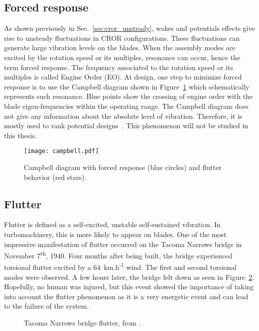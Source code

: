 
\subsection{Forced response}
\label{sub:forced_response}

As shown previously in Sec.~\ref{sec:cror_unsteady}, wakes and
potentials effects give rise to unsteady fluctuations in 
CROR configurations. These fluctuations 
can generate large vibration levels on the blades.
When the assembly modes are excited by the rotation speed
or its multiples, resonance can occur,
hence the term forced response. 
The frequency associated to the rotation speed or its multiples
is called Engine Order (EO).
At design, one step to minimize forced response is
to use the Campbell diagram shown in Figure~\ref{fig:campbell}
which schematically represents such resonance.
Blue points show the crossing of engine order with 
the blade eigen-frequencies within the operating range. 
The Campbell diagram does not give any information about
the absolute level of vibration. Therefore, it is mostly
used to rank potential designs~\cite{Marshall1996}. This phenomenon
will not be studied in this thesis.
\begin{figure}[htp]
  \centering
  \texttt{[image: campbell.pdf]}
  \caption{Campbell diagram with forced response (blue circles)
  and flutter behavior (red stars).}
  \label{fig:campbell}
\end{figure}


\subsection{Flutter}
\label{sub:flutter}

Flutter is defined as a self-excited, unstable 
self-sustained vibration. In turbomachinery, this is
more likely to appear on blades.
One of the most impressive
manifestation of flutter occurred on the Tacoma Narrows
bridge in November 7\textsuperscript{th}, 1940.
Four months after being built, the bridge experienced 
torsional flutter excited by a 
\mbox{$64$~km.h\textsuperscript{-1}} wind.
The first and second torsional modes were observed.
A few hours later, the bridge felt down as seen in 
Figure~\ref{fig:tacoma_bridge}. Hopefully, no human
was injured, but this event showed the importance
of taking into account the flutter phenomenon as
it is a very energetic event and can lead to the failure of the system.
\begin{figure}[htp]
  \centering
  \caption{Tacoma Narrows bridge flutter, from \citet{Smith1974}.}
  \label{fig:tacoma_bridge}
\end{figure}

